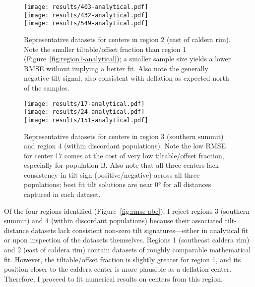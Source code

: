 \begin{figure}
    \vspace{-15pt}
    \texttt{[image: results/403-analytical.pdf]}\\
    \texttt{[image: results/432-analytical.pdf]}\\
    \texttt{[image: results/549-analytical.pdf]}%
    \caption[East of caldera rim: analytical fit]{Representative datasets for centers in region 2 (east of caldera rim). Note the smaller tiltable/offset fraction than region 1 (Figure~\ref{fig:region1-analytical}); a smaller sample size yields a lower \acs{RMSE} without implying a better fit. Also note the generally negative tilt signal, also consistent with deflation as expected north of the samples.}
    \label{fig:region2-analytical}
\end{figure}

\begin{figure}
    \vspace{-12pt}
    \texttt{[image: results/17-analytical.pdf]}\\
    \texttt{[image: results/24-analytical.pdf]}\\
    \texttt{[image: results/151-analytical.pdf]}%
    \caption[Southern regions: analytical fit]{Representative datasets for centers in region 3 (southern summit) and region 4 (within discordant populations). Note the low \acs{RMSE} for center 17 comes at the cost of very low tiltable/offset fraction, especially for population B. Also note that all three centers lack consistency in  tilt sign (positive/negative) across all three populations; best fit tilt solutions are near \ang{0} for all distances captured in each dataset.}
    \label{fig:region34-analytical}
\end{figure}

Of the four regions identified (Figure~\ref{fig:rmse-abc}), I reject regions 3 (southern summit) and 4 (within discordant populations) because their associated tilt-distance datasets lack consistent non-zero tilt signatures---either in analytical fit or upon inspection of the datasets themselves. Regions 1 (southeast caldera rim) and 2 (east of caldera rim) contain datasets of roughly comparable mathematical fit. However, the tiltable/offset fraction is slightly greater for region 1, and its position closer to the caldera center is more plausible as a deflation center. Therefore, I proceed to fit numerical results on centers from this region.

